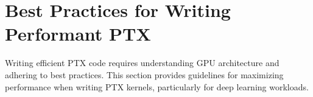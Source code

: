 \section{Best Practices for Writing Performant PTX}

Writing efficient PTX code requires understanding GPU architecture and adhering to best practices. This section provides guidelines for maximizing performance when writing PTX kernels, particularly for deep learning workloads.

